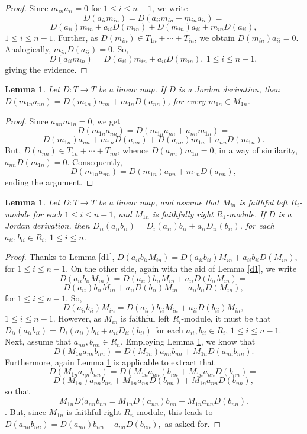 \documentclass[12pt, reqno]{amsart}
\newtheorem{lemma}[theorem]{Lemma}
\theoremstyle{definition}
\numberwithin{equation}{section}
\begin{document}
\begin{proof} Since $m_{in}a_{ii}=0$ for $1\leq i\leq n-1$, we write $$D(a_{ii} m_{in})=D(a_{ii} m_{in}+m_{in}a_{ii})=$$$$D(a_{ii})m_{in}+a_{ii}D(m_{in})+D(m_{in})a_{ii} +m_{in}D(a_{ii}),$$ $1\leq i\leq n-1$. Further, as $D(m_{in})\in T_{1n}+\cdots+T_{in}$, we obtain $D(m_{in})a_{ii} =0$. Analogically, $m_{in}D(a_{ii})=0$. So, $$D(a_{ii} m_{in})=
D(a_{ii})m_{in}+a_{ii} D(m_{in}),\ 1\leq i\leq n-1,$$ giving the evidence.
\end{proof}

\begin{lemma}\label{d2} Let $D : T \longrightarrow T$ be a linear map. If $D$ is a Jordan derivation, then $D(m_{1n}a_{nn})=D (m_{1n})a_{nn}+m_{1n}D(a_{nn})$, for every $m_{1n}\in M_{1n}$.
\end{lemma}

\begin{proof} Since $a_{nn}m_{1n}=0$, we get $$D(m_{1n}a_{nn})=D(m_{1n}a_{nn} +a_{nn}m_{1n})=$$$$D(m_{1n})a_{nn}+m_{1n}D(a_{nn})+D(a_{nn})m_{1n} +a_{nn}D(m_{1n}).$$  But, $D(a_{nn})\in T_{1n}+\cdots+T_{nn}$, whence $D(a_{nn})m_{1n} =0$; in a way of similarity, $a_{nn}D(m_{1n})=0$. Consequently, $$D(m_{1n}a_{nn})=D (m_{1n})a_{nn}+m_{1n}D(a_{nn}),$$ ending the argument.
\end{proof}

\begin{lemma}\label{d3} Let $D : T \longrightarrow T$ be a linear map, and assume that $M_{in}$ is faithful left $R_{i}$-module for each $1\leq i \leq n-1$, and $M_{1n}$ is faithfully right $R_1$-module. If $D$ is a Jordan derivation, then $D_{ii}(a_{ii}b_{ii})=D_{i}(a_{ii})b_{ii}+a_{ii}D_{ii}(b_{ii})$, for each $a_{ii},b_{ii}\in R_i$, $1\leq i \leq n$.
\end{lemma}

\begin{proof} Thanks to Lemma \ref{d1}, $D(a_{ii}b_{ii}M_{in})=D(a_{ii}b_{ii})M_{in}+a_{ii}b_{ii}D(M_{in})$, for $1\leq i\leq n-1$. On the other side, again with the aid of Lemma \ref{d1}, we write $$D(a_{ii}b_{ii}M_{in})=
D(a_{ii})b_{ii}M_{in}+a_{ii}D(b_{ii}M_{in})=$$$$D(a_{ii})b_{ii}M_{in}+a_{ii}D(b_{ii})M_{in}+a_{ii}b_{ii}D(M_{in}),$$ for $1\leq i\leq n-1$. So, $$D(a_{ii}b_{ii})M_{in}=D(a_{ii})b_{ii}M_{in}+a_{ii}D(b_{ii})M_{in},$$ $1\leq i\leq n-1$. However, as $M_{in}$ is faithful left $R_{i}$-module, it must be that $D_{ii}(a_{ii}b_{ii})=D_{i}(a_{ii})b_{ii}+a_{ii}D_{ii}(b_{ii})$ for each $a_{ii},b_{ii}\in R_i$, $1\leq i \leq n-1$.\\
Next, assume that $a_{nn},b_{nn}\in R_n$. Employing Lemma \ref{d2}, we know that $$D(M_{1n}a_{nn}b_{nn})=D(M_{1n})a_{nn}b_{nn}+M_{1n}D(a_{nn}b_{nn}).$$ Furthermore, again Lemma \ref{d2} is applicable to extract that $$D(M_{1n}a_{nn}b_{nn})=D(M_{1n}a_{nn})b_{nn}+M_{1n}a_{nn}D(b_{nn})=$$$$D(M_{1n})a_{nn}b_{nn}+M_{1n}a_{nn}D(b_{nn})+M_{1n}a_{nn}D(b_{nn}),$$ so that $$M_{1n}D(a_{nn}b_{nn}=M_{1n}D(a_{nn})b_{nn}+M_{1n}a_{nn}D(b_{nn}).$$. But, since $M_{1n}$ is faithful right $R_n$-module, this leads to $D(a_{nn}b_{nn})= D(a_{nn})b_{nn}+ a_{nn}D(b_{nn}),$ as asked for.
\end{proof}
\end{document}
